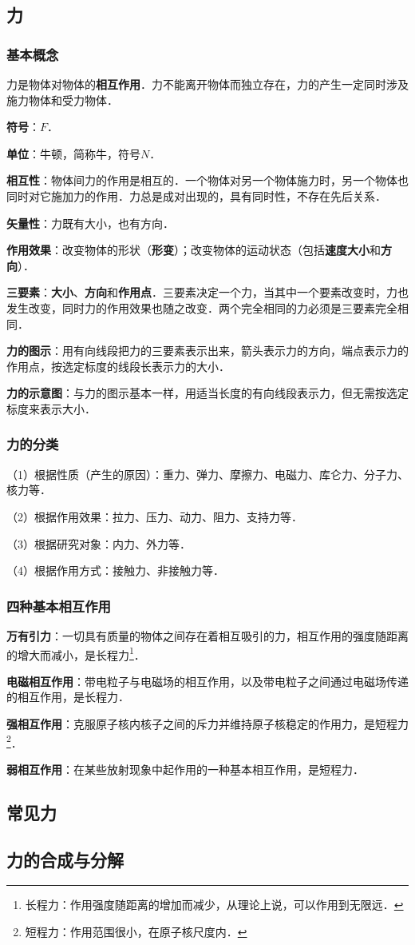 
\begin{issues}
\issueDraft
\issueTODO
\end{issues}

\subsection{力}
\subsubsection{基本概念}
力是物体对物体的\textbf{相互作用}．力不能离开物体而独立存在，力的产生一定同时涉及施力物体和受力物体．

\textbf{符号}：$F$．

\textbf{单位}：牛顿，简称牛，符号$N$．

\textbf{相互性}：物体间力的作用是相互的．一个物体对另一个物体施力时，另一个物体也同时对它施加力的作用．力总是成对出现的，具有同时性，不存在先后关系．

\textbf{矢量性}：力既有大小，也有方向．

\textbf{作用效果}：改变物体的形状（\textbf{形变}）；改变物体的运动状态（包括\textbf{速度大小}和\textbf{方向}）．

\textbf{三要素}：\textbf{大小}、\textbf{方向}和\textbf{作用点}．三要素决定一个力，当其中一个要素改变时，力也发生改变，同时力的作用效果也随之改变．两个完全相同的力必须是三要素完全相同．

\textbf{力的图示}：用有向线段把力的三要素表示出来，箭头表示力的方向，端点表示力的作用点，按选定标度的线段长表示力的大小．

\textbf{力的示意图}：与力的图示基本一样，用适当长度的有向线段表示力，但无需按选定标度来表示大小．

\subsubsection{力的分类}
（1）根据性质（产生的原因）：重力、弹力、摩擦力、电磁力、库仑力、分子力、核力等．

（2）根据作用效果：拉力、压力、动力、阻力、支持力等．

（3）根据研究对象：内力、外力等．

（4）根据作用方式：接触力、非接触力等．

\subsubsection{四种基本相互作用}
\textbf{万有引力}：一切具有质量的物体之间存在着相互吸引的力，相互作用的强度随距离的增大而减小，是长程力\footnote{长程力：作用强度随距离的增加而减少，从理论上说，可以作用到无限远．}．

\textbf{电磁相互作用}：带电粒子与电磁场的相互作用，以及带电粒子之间通过电磁场传递的相互作用，是长程力．

\textbf{强相互作用}：克服原子核内核子之间的斥力并维持原子核稳定的作用力，是短程力\footnote{短程力：作用范围很小，在原子核尺度内．}．

\textbf{弱相互作用}：在某些放射现象中起作用的一种基本相互作用，是短程力．

\subsection{常见力}

\subsection{力的合成与分解}
